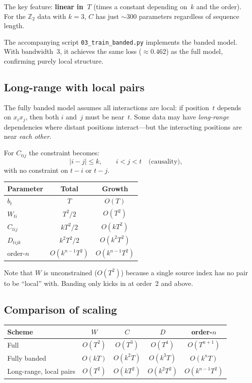 \documentclass[11pt]{article}
\begin{document}
The key feature: \textbf{linear in~$T$} (times a constant depending
on~$k$ and the order).  For the $\mathbb{Z}_2$ data with $k = 3$, $C$
has just $\sim$300 parameters regardless of sequence length.

The accompanying script \texttt{03\_train\_banded.py} implements the
banded model.  With bandwidth~3, it achieves the same loss
($\approx 0.462$) as the full model, confirming purely local structure.

\subsection{Long-range with local pairs}\label{sec:longrange}

The fully banded model assumes all interactions are local: if position~$t$
depends on $x_i x_j$, then both $i$ and~$j$ must be near~$t$.  Some data
may have \emph{long-range} dependencies where distant positions
interact---but the interacting positions are near \emph{each other}.

For $C_{tij}$ the constraint becomes:
\[
  |i - j| \leq k, \qquad i < j < t \quad\text{(causality)},
\]
with no constraint on $t - i$ or $t - j$.

\begin{center}
\begin{tabular}{lcc}
\toprule
Parameter & Total & Growth \\
\midrule
$b_t$      & $T$        & $O(T)$     \\
$W_{ti}$   & $T^2/2$    & $O(T^2)$   \\
$C_{tij}$  & $kT^2/2$   & $O(kT^2)$  \\
$D_{tijk}$ & $k^2 T^2/2$& $O(k^2 T^2)$ \\
order-$n$  & $O(k^{n-1} T^2)$ & $O(k^{n-1} T^2)$ \\
\bottomrule
\end{tabular}
\end{center}

Note that $W$ is unconstrained ($O(T^2)$) because a single source index
has no pair to be ``local'' with.  Banding only kicks in at order~2 and
above.

\subsection{Comparison of scaling}

\begin{center}
\begin{tabular}{lcccc}
\toprule
Scheme & $W$ & $C$ & $D$ & order-$n$ \\
\midrule
Full          & $O(T^2)$ & $O(T^3)$  & $O(T^4)$  & $O(T^{n+1})$ \\
Fully banded  & $O(kT)$  & $O(k^2 T)$& $O(k^3 T)$& $O(k^n T)$ \\
Long-range, local pairs
              & $O(T^2)$ & $O(kT^2)$ & $O(k^2 T^2)$ & $O(k^{n-1} T^2)$ \\
\bottomrule
\end{tabular}
\end{center}
\end{document}
